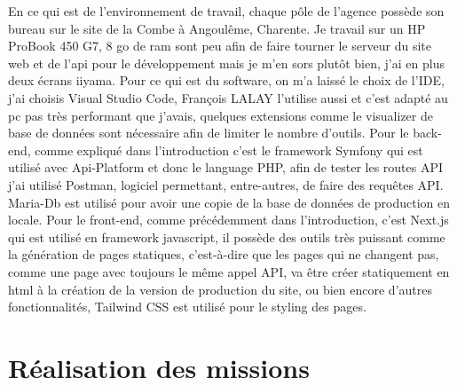 \documentclass[a4paper,12pt]{report}
\begin{document}
En ce qui est de l'environnement de travail, chaque pôle de l'agence possède son bureau sur le site de la Combe à Angoulême, Charente. Je travail sur un HP ProBook 450 G7, 8 go de ram sont peu afin de faire tourner le serveur du site web et de l'api pour le développement mais je m'en sors plutôt bien, j'ai en plus deux écrans iiyama. Pour ce qui est du software, on m'a laissé le choix de l'IDE, j'ai choisis Visual Studio Code, François LALAY l'utilise aussi et c'est adapté au pc pas très performant que j'avais, quelques extensions comme le visualizer de base de données sont nécessaire afin de limiter le nombre d'outils. Pour le back-end, comme expliqué dans l'introduction c'est le framework Symfony qui est utilisé avec Api-Platform et donc le language PHP, afin de tester les routes API j'ai utilisé Postman, logiciel permettant, entre-autres, de faire des requêtes API. Maria-Db est utilisé pour avoir une copie de la base de données de production en locale. Pour le front-end, comme précédemment dans l'introduction, c'est Next.js qui est utilisé en framework javascript, il possède des outils très puissant comme la génération de pages statiques, c'est-à-dire que les pages qui ne changent pas, comme une page avec toujours le même appel API, va être créer statiquement en html à la création de la version de production du site, ou bien encore d'autres fonctionnalités, Tailwind CSS est utilisé pour le styling des pages.

\chapter{Réalisation des missions}
\end{document}
